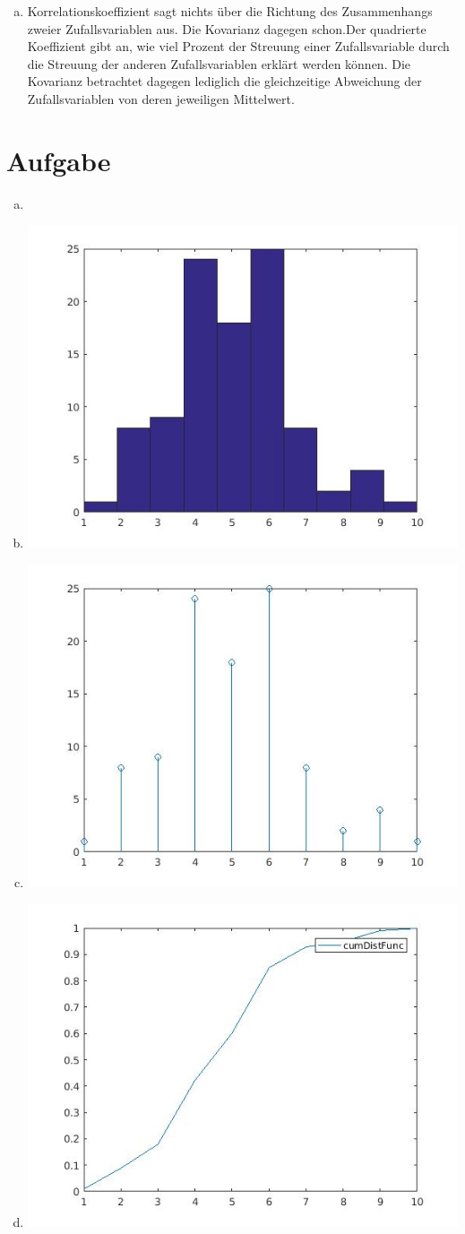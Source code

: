 \documentclass[a4paper]{scrartcl}
\begin{document}
\begin{enumerate}[a)]
	\item 
	Korrelationskoeffizient sagt nichts über die Richtung des Zusammenhangs zweier Zufallsvariablen aus. Die Kovarianz dagegen schon.Der quadrierte Koeffizient gibt an, wie viel Prozent der Streuung einer Zufallsvariable durch die Streuung der anderen Zufallsvariablen erklärt werden können. Die Kovarianz betrachtet dagegen lediglich die gleichzeitige Abweichung der Zufallsvariablen von deren jeweiligen Mittelwert.\\
	
\end{enumerate}

\section{Aufgabe}

\begin{enumerate}[a)]
	\item 
	\item 
		\includegraphics[width=.6\textwidth]{plots/4b.jpg}
	\item 
		\includegraphics[width=.6\textwidth]{plots/4c.jpg}
	\item 
		\includegraphics[width=.6\textwidth]{plots/4d.jpg}

\end{enumerate}
\end{document}
